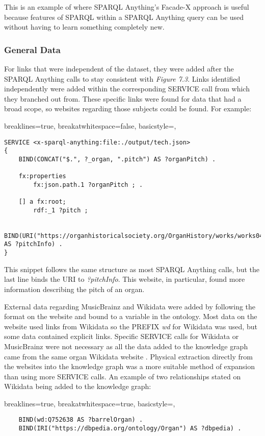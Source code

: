 This is an example of where SPARQL Anything's Facade-X approach is useful because features of SPARQL within a SPARQL Anything query can be used without having to learn something completely new. 

\subsubsection{General Data}
\hspace*{0.5cm} For links that were independent of the dataset, they were added after the SPARQL Anything calls to stay consistent with \textit{Figure 7.3}. Links identified independently were added within the corresponding SERVICE call from which they branched out from. These specific links were found for data that had a broad scope, so websites regarding those subjects could be found. For example:

\lstset
{
    breaklines=true,
    breakatwhitespace=false,
    basicstyle=\linespread{1.5}\ttfamily,
}
\begin{lstlisting}
SERVICE <x-sparql-anything:file:./output/tech.json>
{
    BIND(CONCAT("$.", ?_organ, ".pitch") AS ?organPitch) .

    fx:properties
        fx:json.path.1 ?organPitch ; .

    [] a fx:root; 
        rdf:_1 ?pitch ;
    
    BIND(URI("https://organhistoricalsociety.org/OrganHistory/works/works04.htm") AS ?pitchInfo) .
} 
\end{lstlisting}

This snippet follows the same structure as most SPARQL Anything calls, but the last line binds the URI to \textit{?pitchInfo}. This website, in particular, found more information describing the pitch of an organ. 

External data regarding MusicBrainz and Wikidata were added by following the format on the website and bound to a variable in the ontology. Most data on the website used links from Wikidata so the PREFIX \textit{wd} for Wikidata was used, but some data contained explicit links. Specific SERVICE calls for Wikidata or MusicBrainz were not necessary as all the data added to the knowledge graph came from the same organ Wikidata website \cite{organwikidata}. Physical extraction directly from the websites into the knowledge graph was a more suitable method of expansion than using more SERVICE calls. An example of two relationships stated on Wikidata being added to the knowledge graph:

\lstset
{
    breaklines=true,
    breakatwhitespace=true,
    basicstyle=\linespread{1.5}\ttfamily,
}
\begin{lstlisting}
    BIND(wd:Q752638 AS ?barrelOrgan) . 
    BIND(IRI("https://dbpedia.org/ontology/Organ") AS ?dbpedia) .
\end{lstlisting}

